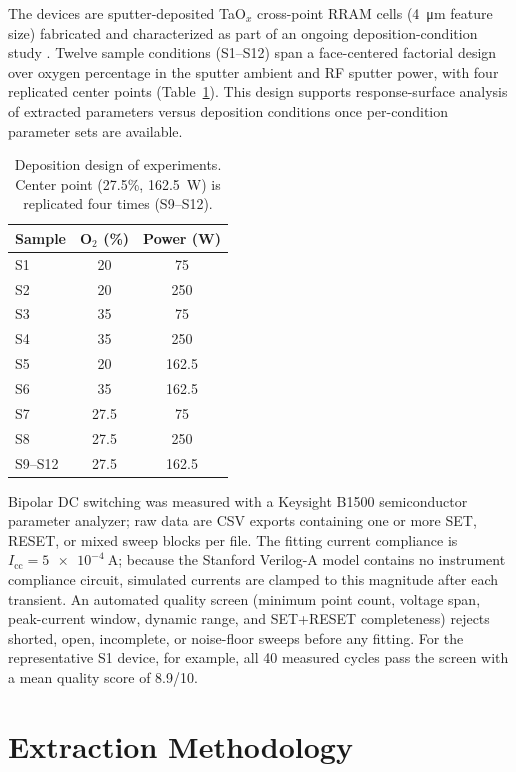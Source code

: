 \documentclass[journal]{IEEEtran}
\begin{document}
The devices are sputter-deposited TaO$_x$ cross-point RRAM cells
(\SI{4}{\micro\meter} feature size) fabricated and characterized as part of
an ongoing deposition-condition study \cite{chowdhury2025mwscas,
moazzeni2023}.  Twelve sample conditions (S1--S12) span a face-centered
factorial design over oxygen percentage in the sputter ambient and RF
sputter power, with four replicated center points
(Table~\ref{tab:doe}).  This design supports response-surface analysis of
extracted parameters versus deposition conditions once per-condition
parameter sets are available.

\begin{table}[!t]
\centering
\caption{Deposition design of experiments. Center point (27.5\%,
\SI{162.5}{\watt}) is replicated four times (S9--S12).}
\label{tab:doe}
\footnotesize
\begin{tabular}{@{}lcc@{}}
\toprule
Sample & O$_2$ (\%) & Power (W)\\
\midrule
S1 & 20   & 75\\
S2 & 20   & 250\\
S3 & 35   & 75\\
S4 & 35   & 250\\
S5 & 20   & 162.5\\
S6 & 35   & 162.5\\
S7 & 27.5 & 75\\
S8 & 27.5 & 250\\
S9--S12 & 27.5 & 162.5\\
\bottomrule
\end{tabular}
\end{table}

Bipolar DC switching was measured with a Keysight B1500 semiconductor
parameter analyzer; raw data are CSV exports containing one or more SET,
RESET, or mixed sweep blocks per file.  The fitting current compliance is
$I_{\mathrm{cc}}=\SI{5e-4}{\ampere}$; because the Stanford Verilog-A model
contains no instrument compliance circuit, simulated currents are clamped to
this magnitude after each transient.  An automated quality screen (minimum
point count, voltage span, peak-current window, dynamic range, and
SET+RESET completeness) rejects shorted, open, incomplete, or noise-floor
sweeps before any fitting.  For the representative S1 device, for example,
all 40 measured cycles pass the screen with a mean quality score of 8.9/10.

\section{Extraction Methodology}
\label{sec:method}
\end{document}
